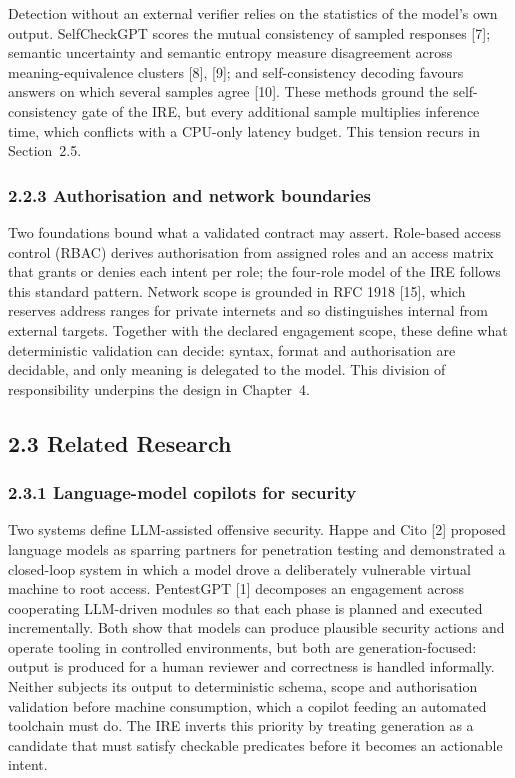 \documentclass[
]{article}
\begin{document}
Detection without an external verifier relies on the statistics of the
model's own output. SelfCheckGPT scores the mutual consistency of
sampled responses {[}7{]}; semantic uncertainty and semantic entropy
measure disagreement across meaning-equivalence clusters {[}8{]},
{[}9{]}; and self-consistency decoding favours answers on which several
samples agree {[}10{]}. These methods ground the self-consistency gate
of the IRE, but every additional sample multiplies inference time, which
conflicts with a CPU-only latency budget. This tension recurs in
Section~2.5.

\hypertarget{authorisation-and-network-boundaries}{%
\subsubsection{2.2.3 Authorisation and network
boundaries}\label{authorisation-and-network-boundaries}}

Two foundations bound what a validated contract may assert. Role-based
access control (RBAC) derives authorisation from assigned roles and an
access matrix that grants or denies each intent per role; the four-role
model of the IRE follows this standard pattern. Network scope is
grounded in RFC 1918 {[}15{]}, which reserves address ranges for private
internets and so distinguishes internal from external targets. Together
with the declared engagement scope, these define what deterministic
validation can decide: syntax, format and authorisation are decidable,
and only meaning is delegated to the model. This division of
responsibility underpins the design in Chapter~4.

\hypertarget{related-research}{%
\subsection{2.3 Related Research}\label{related-research}}

\hypertarget{language-model-copilots-for-security}{%
\subsubsection{2.3.1 Language-model copilots for
security}\label{language-model-copilots-for-security}}

Two systems define LLM-assisted offensive security. Happe and Cito
{[}2{]} proposed language models as sparring partners for penetration
testing and demonstrated a closed-loop system in which a model drove a
deliberately vulnerable virtual machine to root access. PentestGPT
{[}1{]} decomposes an engagement across cooperating LLM-driven modules
so that each phase is planned and executed incrementally. Both show that
models can produce plausible security actions and operate tooling in
controlled environments, but both are generation-focused: output is
produced for a human reviewer and correctness is handled informally.
Neither subjects its output to deterministic schema, scope and
authorisation validation before machine consumption, which a copilot
feeding an automated toolchain must do. The IRE inverts this priority by
treating generation as a candidate that must satisfy checkable
predicates before it becomes an actionable intent.
\end{document}
